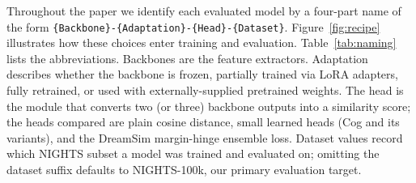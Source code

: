 \appendix
\clearpage

\vspace{1em}

Throughout the paper we identify each evaluated model by a four-part name of the form \texttt{\{Backbone\}-\{Adaptation\}-\{Head\}-\{Dataset\}}. Figure~\ref{fig:recipe} illustrates how these choices enter training and evaluation. Table~\ref{tab:naming} lists the abbreviations. Backbones are the feature extractors. Adaptation describes whether the backbone is frozen, partially trained via LoRA adapters, fully retrained, or used with externally-supplied pretrained weights. The head is the module that converts two (or three) backbone outputs into a similarity score; the heads compared are plain cosine distance, small learned heads (Cog and its variants), and the DreamSim margin-hinge ensemble loss. Dataset values record which NIGHTS subset a model was trained and evaluated on; omitting the dataset suffix defaults to NIGHTS-100k, our primary evaluation target.

